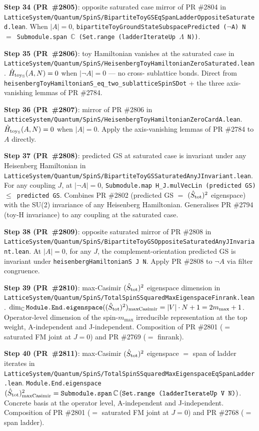 \documentclass[a4paper,11pt]{article}
\begin{document}
\textbf{Step 34 (PR~\#2805)}: opposite saturated case mirror of
PR \#2804 in
\texttt{LatticeSystem/Quantum/SpinS/BipartiteToyGSEqSpanLadderOppositeSaturated.lean}.
When $|A| = 0$,
\texttt{bipartiteToyGroundStateSubspacePredicted ($\neg$A) N $=$
Submodule.span $\mathbb{C}$ (Set.range (ladderIterateUp $\Lambda$ N))}.

\textbf{Step 35 (PR~\#2806)}: toy Hamiltonian vanishes at the
saturated case in
\texttt{LatticeSystem/Quantum/SpinS/HeisenbergToyHamiltonianZeroSaturated.lean}.
$\hat H_{\rm toy_S}(A, N) = 0$ when $|\neg A| = 0$ — no cross-
sublattice bonds. Direct from
\texttt{heisenbergToyHamiltonianS\_eq\_two\_sublatticeSpinSDot} +
the three axis-vanishing lemmas of PR \#2784.

\textbf{Step 36 (PR~\#2807)}: mirror of PR \#2806 in
\texttt{LatticeSystem/Quantum/SpinS/HeisenbergToyHamiltonianZeroCardA.lean}.
$\hat H_{\rm toy_S}(A, N) = 0$ when $|A| = 0$. Apply the
axis-vanishing lemmas of PR \#2784 to $A$ directly.

\textbf{Step 37 (PR~\#2808)}: predicted GS at saturated case is
invariant under any Heisenberg Hamiltonian in
\texttt{LatticeSystem/Quantum/SpinS/BipartiteToyGSSaturatedAnyJInvariant.lean}.
For any coupling $J$, at $|\neg A| = 0$,
\texttt{Submodule.map H\_J.mulVecLin (predicted GS) $\le$
predicted GS}. Combines PR \#2802 (predicted GS $=$
$(\hat S_{\rm tot})^2$ eigenspace) with the SU(2) invariance of
any Heisenberg Hamiltonian. Generalises PR \#2794 (toy-H
invariance) to any coupling at the saturated case.

\textbf{Step 38 (PR~\#2809)}: opposite saturated mirror of
PR \#2808 in
\texttt{LatticeSystem/Quantum/SpinS/BipartiteToyGSOppositeSaturatedAnyJInvariant.lean}.
At $|A| = 0$, for any $J$, the complement-orientation predicted
GS is invariant under
\texttt{heisenbergHamiltonianS J N}. Apply PR \#2808 to $\neg A$
via filter congruence.

\textbf{Step 39 (PR~\#2810)}: max-Casimir $(\hat S_{\rm tot})^2$
eigenspace dimension in
\texttt{LatticeSystem/Quantum/SpinS/TotalSpinSSquaredMaxEigenspaceFinrank.lean}.
$\dim_\mathbb{C} \texttt{Module.End.eigenspace}((\hat S_{\rm tot})^2)
_{\rm maxCasimir} = |V|\cdot N + 1 = 2 m_{\max}+1$. Operator-level
dimension of the spin-$m_{\max}$ irreducible representation at the
top weight, A-independent and J-independent. Composition of PR
\#2801 ($=$ saturated FM joint at $J=0$) and PR \#2769 ($=$
finrank).

\textbf{Step 40 (PR~\#2811)}: max-Casimir $(\hat S_{\rm tot})^2$
eigenspace $=$ span of ladder iterates in
\texttt{LatticeSystem/Quantum/SpinS/TotalSpinSSquaredMaxEigenspaceEqSpanLadder.lean}.
\texttt{Module.End.eigenspace} $(\hat S_{\rm tot})^2_{\rm maxCasimir}
= \texttt{Submodule.span}\,\mathbb{C}\,
(\texttt{Set.range (ladderIterateUp V N)})$. Concrete basis at
the operator level, A-independent and J-independent. Composition
of PR \#2801 ($=$ saturated FM joint at $J=0$) and PR \#2768 ($=$
span ladder).
\end{document}
